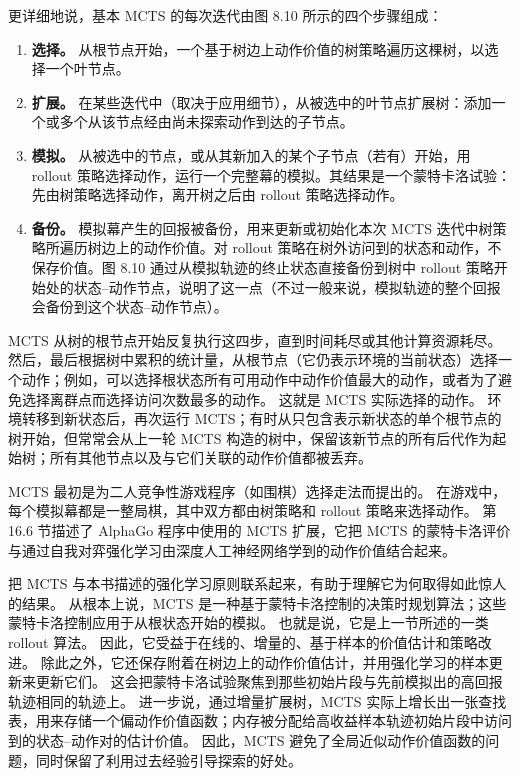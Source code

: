\documentclass[UTF8,12pt,a4paper,fontset=fandol]{ctexart}
\begin{document}
更详细地说，基本 MCTS 的每次迭代由图 8.10 所示的四个步骤组成：
\begin{enumerate}
\item \textbf{选择。} 从根节点开始，一个基于树边上动作价值的树策略遍历这棵树，以选择一个叶节点。
\item \textbf{扩展。} 在某些迭代中（取决于应用细节），从被选中的叶节点扩展树：添加一个或多个从该节点经由尚未探索动作到达的子节点。
\item \textbf{模拟。} 从被选中的节点，或从其新加入的某个子节点（若有）开始，用 rollout 策略选择动作，运行一个完整幕的模拟。其结果是一个蒙特卡洛试验：先由树策略选择动作，离开树之后由 rollout 策略选择动作。
\item \textbf{备份。} 模拟幕产生的回报被备份，用来更新或初始化本次 MCTS 迭代中树策略所遍历树边上的动作价值。对 rollout 策略在树外访问到的状态和动作，不保存价值。图 8.10 通过从模拟轨迹的终止状态直接备份到树中 rollout 策略开始处的状态--动作节点，说明了这一点（不过一般来说，模拟轨迹的整个回报会备份到这个状态--动作节点）。
\end{enumerate}

MCTS 从树的根节点开始反复执行这四步，直到时间耗尽或其他计算资源耗尽。
然后，最后根据树中累积的统计量，从根节点（它仍表示环境的当前状态）选择一个动作；例如，可以选择根状态所有可用动作中动作价值最大的动作，或者为了避免选择离群点而选择访问次数最多的动作。
这就是 MCTS 实际选择的动作。
环境转移到新状态后，再次运行 MCTS；有时从只包含表示新状态的单个根节点的树开始，但常常会从上一轮 MCTS 构造的树中，保留该新节点的所有后代作为起始树；所有其他节点以及与它们关联的动作价值都被丢弃。

MCTS 最初是为二人竞争性游戏程序（如围棋）选择走法而提出的。
在游戏中，每个模拟幕都是一整局棋，其中双方都由树策略和 rollout 策略来选择动作。
第 16.6 节描述了 AlphaGo 程序中使用的 MCTS 扩展，它把 MCTS 的蒙特卡洛评价与通过自我对弈强化学习由深度人工神经网络学到的动作价值结合起来。

把 MCTS 与本书描述的强化学习原则联系起来，有助于理解它为何取得如此惊人的结果。
从根本上说，MCTS 是一种基于蒙特卡洛控制的决策时规划算法；这些蒙特卡洛控制应用于从根状态开始的模拟。
也就是说，它是上一节所述的一类 rollout 算法。
因此，它受益于在线的、增量的、基于样本的价值估计和策略改进。
除此之外，它还保存附着在树边上的动作价值估计，并用强化学习的样本更新来更新它们。
这会把蒙特卡洛试验聚焦到那些初始片段与先前模拟出的高回报轨迹相同的轨迹上。
进一步说，通过增量扩展树，MCTS 实际上增长出一张查找表，用来存储一个偏动作价值函数；内存被分配给高收益样本轨迹初始片段中访问到的状态--动作对的估计价值。
因此，MCTS 避免了全局近似动作价值函数的问题，同时保留了利用过去经验引导探索的好处。
\end{document}
